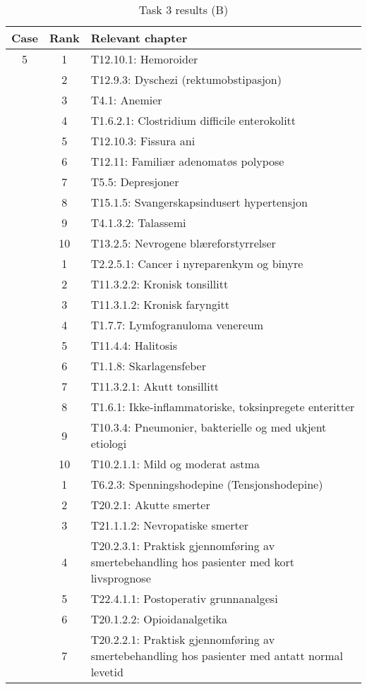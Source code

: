 \documentclass[a4paper, 11pt]{article}
\begin{document}
\begin{table}[htbp] \footnotesize \center
\caption{Task 3 results (B)\label{tab:task3b}}
\begin{tabularx}{\textwidth}{c c X}
    \toprule
    Case & Rank & Relevant chapter \\
    \midrule
	5 & 1 & T12.10.1: Hemoroider \\
	 & 2 & T12.9.3: Dyschezi (rektumobstipasjon) \\
	 & 3 & T4.1: Anemier \\
	 & 4 & T1.6.2.1: Clostridium difficile enterokolitt \\
	 & 5 & T12.10.3: Fissura ani \\
	 & 6 & T12.11: Familiær adenomatøs polypose \\
	 & 7 & T5.5: Depresjoner \\
	 & 8 & T15.1.5: Svangerskapsindusert hypertensjon \\
	 & 9 & T4.1.3.2: Talassemi \\
	 & 10 & T13.2.5: Nevrogene blæreforstyrrelser \\
	\addlinespace
	6 & 1 & T2.2.5.1: Cancer i nyreparenkym og binyre \\
	 & 2 & T11.3.2.2: Kronisk tonsillitt \\
	 & 3 & T11.3.1.2: Kronisk faryngitt \\
	 & 4 & T1.7.7: Lymfogranuloma venereum \\
	 & 5 & T11.4.4: Halitosis \\
	 & 6 & T1.1.8: Skarlagensfeber \\
	 & 7 & T11.3.2.1: Akutt tonsillitt \\
	 & 8 & T1.6.1: Ikke-inflammatoriske, toksinpregete enteritter \\
	 & 9 & T10.3.4: Pneumonier, bakterielle og med ukjent etiologi \\
	 & 10 & T10.2.1.1: Mild og moderat astma \\
	\addlinespace
	7 & 1 & T6.2.3: Spenningshodepine (Tensjonshodepine) \\
	 & 2 & T20.2.1: Akutte smerter \\
	 & 3 & T21.1.1.2: Nevropatiske smerter \\
	 & 4 & T20.2.3.1: Praktisk gjennomføring av smertebehandling hos pasienter med kort livsprognose \\
	 & 5 & T22.4.1.1: Postoperativ grunnanalgesi \\
	 & 6 & T20.1.2.2: Opioidanalgetika \\
	 & 7 & T20.2.2.1: Praktisk gjennomføring av smertebehandling hos pasienter med antatt normal levetid \\

\end{tabularx}
\end{table}
\end{document}

